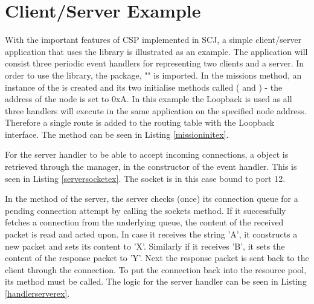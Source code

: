 \section{Client/Server Example} %
\label{sec:client_server_example}
With the important features of CSP implemented in SCJ, a simple client/server application that uses the library is illustrated as an example. The application will consist three periodic event handlers for representing two clients and a server. In order to use the library, the package, "" is imported. In the missions  method, an instance of the  is created and its two initialise methods called ( and ) - the address of the node is set to 0xA. In this example the Loopback is used as all three handlers will execute in the same application on the specified node address. Therefore a single route is added to the routing table with the Loopback interface. The  method can be seen in Listing \ref{missioninitex}. 



For the server handler to be able to accept incoming connections, a  object is retrieved through the manager, in the constructor of the event handler. This is seen in Listing \ref{serversocketex}. The socket is in this case bound to port 12.



In the  method of the server, the server checks (once) its connection queue for a pending connection attempt by calling the sockets  method. If it successfully fetches a connection from the underlying queue, the content of the received packet is read and acted upon. In case it receives the string 'A', it constructs a new packet and sets its content to 'X'. Similarly if it receives 'B', it sets the content of the response packet to 'Y'. Next the response packet is sent back to the client through the connection. To put the connection back into the resource pool, its  method must be called. The logic for the server handler can be seen in Listing \ref{handlerserverex}.



